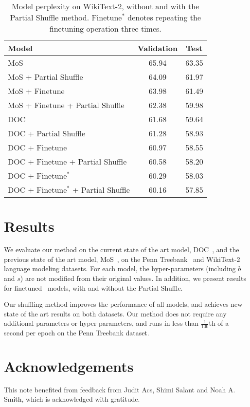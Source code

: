 \documentclass[11pt,a4paper]{article}
\begin{document}
\begin{table}[t!]
\begin{center}
{\small

\begin{tabular}{@{}lcc@{}}
\toprule
Model                                & Validation & Test  \\ \midrule
MoS                                  & 65.94      & 63.35 \\
MoS + Partial Shuffle              & 64.09      & 61.97 \\
MoS + Finetune                       & 63.98      & 61.49 \\
MoS + Finetune + Partial Shuffle   & 62.38      & 59.98 \\ \midrule
DOC                                  & 61.68      & 59.64 \\
DOC + Partial Shuffle              & 61.28      & 58.93 \\
DOC + Finetune                       & 60.97      & 58.55 \\
DOC + Finetune + Partial Shuffle   & 60.58      & 58.20  \\
DOC + Finetune$^*$                     &    60.29        &   58.03    \\
DOC + Finetune$^*$ + Partial Shuffle &  60.16         &  57.85     \\ \bottomrule
\end{tabular} }

\end{center}
\caption{\label{PTB} Model perplexity on WikiText-2, without and with the Partial Shuffle method. Finetune$^*$ denotes repeating the finetuning operation three times. }
\end{table}

\section{Results}
We evaluate our method on the current state of the art model, DOC~\cite{doc}, and the previous state of the art model, MoS~\cite{mos}, on the Penn Treebank~\cite{ptb} and WikiText-2~\cite{wt2} language modeling datasets. For each model, the hyper-parameters (including $b$ and $s$) are not modified from their original values. In addition, we present results for finetuned~\cite{awd} models, with and without the Partial Shuffle. 

Our shuffling method improves the performance of all models, and achieves new state of the art results on both datasets. Our method does not require any additional parameters or hyper-parameters, and runs in less than $\frac{1}{100}$th of a second per epoch on the Penn Treebank dataset.

\section{Acknowledgements}
This note benefited from feedback from Judit Acs, Shimi Salant and Noah A. Smith, which is acknowledged with gratitude. 




\end{document}
